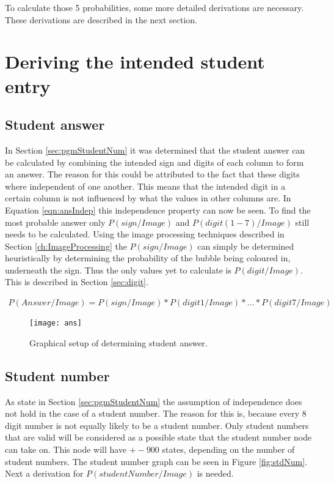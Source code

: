 To calculate those 5 probabilities, some more detailed derivations are necessary. These derivations are described in the next section.

\section{Deriving the intended student entry}

\subsection{Student answer}

In Section \ref{sec:pgmStudentNum} it was determined that the student answer can be calculated by combining the intended sign and digits of each column to form an answer. The reason for this could be attributed to the fact that these digits where independent of one another. This means that the intended digit in a certain column is not influenced by what the values in other columns are. In Equation \ref{eqn:ansIndep} this independence property can now be seen. To find the most probable answer only $P(sign/Image)$ and $P(digit(1-7)/Image)$ still needs to be calculated. Using the image processing techniques described in Section \ref{ch:ImageProcessing} the $P(sign/Image)$ can simply be determined heuristically by determining the probability of the bubble being coloured in, underneath the sign. Thus the only values yet to calculate is $P(digit/Image)$. This is described in Section \ref{sec:digit}.

\begin{align}
  P(Answer/Image) =  P(sign/Image)*P(digit1/Image)*...*P(digit7/Image)
\label{eqn:ansIndep}
\end{align}

\begin{figure}
  \centering
  \texttt{[image: ans]}\\
  \caption{Graphical setup of determining student answer.}
  \label{fig:ans}
\end{figure}

\subsection{Student number}

As state in Section \ref{sec:pgmStudentNum} the assumption of independence does not hold in the case of a student number. The reason for this is, because every 8 digit number is not equally likely to be a student number. Only student numbers that are valid will be considered as a possible state that the student number node can take on. This node will have $+- 900$ states, depending on the number of student numbers. The student number graph can be seen in Figure \ref{fig:stdNum}. Next a derivation for $P(studentNumber/Image)$ is needed. 

